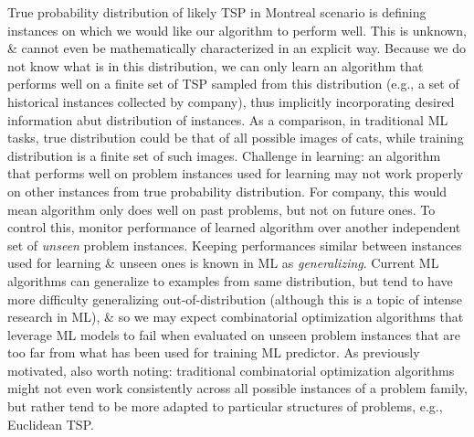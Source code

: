 \documentclass{article}
\begin{document}
\begin{itemize}
\begin{itemize}
        True probability distribution of likely TSP in Montreal scenario is defining instances on which we would like our algorithm to perform well. This is unknown, \& cannot even be mathematically characterized in an explicit way. Because we do not know what is in this distribution, we can only learn an algorithm that performs well on a finite set of TSP sampled from this distribution (e.g., a set of historical instances collected by company), thus implicitly incorporating desired information abut distribution of instances. As a comparison, in traditional ML tasks, true distribution could be that of all possible images of cats, while training distribution is a finite set of such images. Challenge in learning: an algorithm that performs well on problem instances used for learning may not work properly on other instances from true probability distribution. For company, this would mean algorithm only does well on past problems, but not on future ones. To control this, monitor performance of learned algorithm over another independent set of {\it unseen} problem instances. Keeping performances similar between instances used for learning \& unseen ones is known in ML as {\it generalizing}. Current ML algorithms can generalize to examples from same distribution, but tend to have more difficulty generalizing out-of-distribution (although this is a topic of intense research in ML), \& so we may expect combinatorial optimization algorithms that leverage ML models to fail when evaluated on unseen problem instances that are too far from what has been used for training ML predictor. As previously motivated, also worth noting: traditional combinatorial optimization algorithms might not even work consistently across all possible instances of a problem family, but rather tend to be more adapted to particular structures of problems, e.g., Euclidean TSP.


\end{itemize}
\end{itemize}
\end{document}

